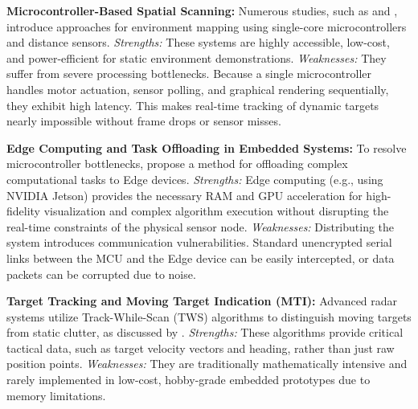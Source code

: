 \documentclass[14pt]{article}
\begin{document}
\textbf{Microcontroller-Based Spatial Scanning:}
Numerous studies, such as \cite{TODO_ArduinoRadar1} and \cite{TODO_LowCostSonar}, introduce approaches for environment mapping using single-core microcontrollers and distance sensors. 
\textit{Strengths:} These systems are highly accessible, low-cost, and power-efficient for static environment demonstrations.
\textit{Weaknesses:} They suffer from severe processing bottlenecks. Because a single microcontroller handles motor actuation, sensor polling, and graphical rendering sequentially, they exhibit high latency. This makes real-time tracking of dynamic targets nearly impossible without frame drops or sensor misses.

\textbf{Edge Computing and Task Offloading in Embedded Systems:}
To resolve microcontroller bottlenecks, \cite{TODO_EdgeComputing1} propose a method for offloading complex computational tasks to Edge devices.
\textit{Strengths:} Edge computing (e.g., using NVIDIA Jetson) provides the necessary RAM and GPU acceleration for high-fidelity visualization and complex algorithm execution without disrupting the real-time constraints of the physical sensor node.
\textit{Weaknesses:} Distributing the system introduces communication vulnerabilities. Standard unencrypted serial links between the MCU and the Edge device can be easily intercepted, or data packets can be corrupted due to noise.

\textbf{Target Tracking and Moving Target Indication (MTI):}
Advanced radar systems utilize Track-While-Scan (TWS) algorithms to distinguish moving targets from static clutter, as discussed by \cite{TODO_MTI_Algorithm}.
\textit{Strengths:} These algorithms provide critical tactical data, such as target velocity vectors and heading, rather than just raw position points.
\textit{Weaknesses:} They are traditionally mathematically intensive and rarely implemented in low-cost, hobby-grade embedded prototypes due to memory limitations.
\end{document}
